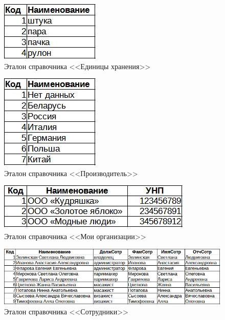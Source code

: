 \documentclass[12pt, a4paper, simple]{eskdtext}
\begin{document}
    \begin{figure}[!h]
        \centering
        \includegraphics[]
            {_docs/СП_ЕдХран_эталон.jpg}
        \caption{Эталон справочника <<Единицы хранения>>}
        \label{fig:CP_EdHran_etalon}
    \end{figure}
    
        \begin{figure}[!h]
            \centering
            \includegraphics[]
                {_docs/СП_Произв_эталон.jpg}
            \caption{Эталон справочника <<Производитель>>}
            \label{fig:CP_Proizv_etalon}
        \end{figure}

    \begin{figure}[!h]
        \centering
        \includegraphics[]
            {_docs/СП_МоиОрг_эталон.jpg}
        \caption{Эталон справочника <<Мои организации>>}
        \label{fig:CP_MoiOrg_etalon}
    \end{figure}

    \begin{figure}[!h]
        \centering
        \includegraphics[]
            {_docs/СП_Сотр_эталон.jpg}
        \caption{Эталон справочника <<Сотрудники>>}
        \label{fig:CP_Sotrudniki_etalon}
    \end{figure}
\end{document}
